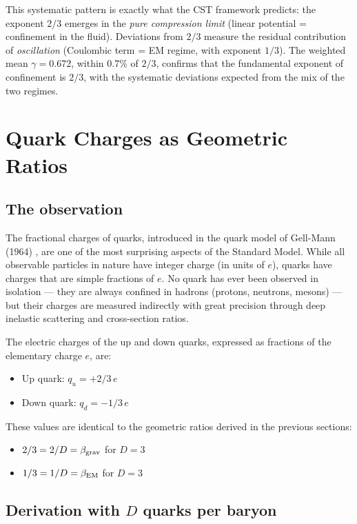 \documentclass[10pt,a4paper]{article}
\begin{document}
This systematic pattern is exactly what the CST framework predicts: the exponent $2/3$ emerges in the \textit{pure compression limit} (linear potential = confinement in the fluid). Deviations from $2/3$ measure the residual contribution of \textit{oscillation} (Coulombic term = EM regime, with exponent $1/3$). The weighted mean $\gamma = 0.672$, within 0.7\% of $2/3$, confirms that the fundamental exponent of confinement is $2/3$, with the systematic deviations expected from the mix of the two regimes.


\section{Quark Charges as Geometric Ratios}\label{sec:quark}

\subsection{The observation}

The fractional charges of quarks, introduced in the quark model of Gell-Mann (1964) \cite{GellMann1964}, are one of the most surprising aspects of the Standard Model. While all observable particles in nature have integer charge (in units of $e$), quarks have charges that are simple fractions of $e$. No quark has ever been observed in isolation --- they are always confined in hadrons (protons, neutrons, mesons) --- but their charges are measured indirectly with great precision through deep inelastic scattering and cross-section ratios.

The electric charges of the up and down quarks, expressed as fractions of the elementary charge $e$, are:
\begin{itemize}
\item Up quark: $q_u = +2/3\,e$
\item Down quark: $q_d = -1/3\,e$
\end{itemize}

These values are identical to the geometric ratios derived in the previous sections:
\begin{itemize}
\item $2/3 = 2/D = \beta_{\rm grav}$ for $D = 3$
\item $1/3 = 1/D = \beta_{\rm EM}$ for $D = 3$
\end{itemize}

\subsection{Derivation with $D$ quarks per baryon}\label{sec:Dquarks}
\end{document}
